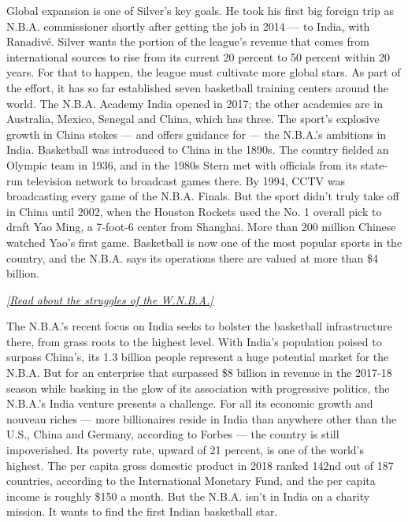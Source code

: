Global expansion is one of Silver's key goals. He took his first big
foreign trip as N.B.A. commissioner shortly after getting the job in
2014 --- to India, with Ranadivé. Silver wants the portion of the
league's revenue that comes from international sources to rise from its
current 20 percent to 50 percent within 20 years. For that to happen,
the league must cultivate more global stars. As part of the effort, it
has so far established seven basketball training centers around the
world. The N.B.A. Academy India opened in 2017; the other academies are
in Australia, Mexico, Senegal and China, which has three. The sport's
explosive growth in China stokes --- and offers guidance for --- the
N.B.A.'s ambitions in India. Basketball was introduced to China in the
1890s. The country fielded an Olympic team in 1936, and in the 1980s
Stern met with officials from its state-run television network to
broadcast games there. By 1994, CCTV was broadcasting every game of the
N.B.A. Finals. But the sport didn't truly take off in China until 2002,
when the Houston Rockets used the No. 1 overall pick to draft Yao Ming,
a 7-foot-6 center from Shanghai. More than 200 million Chinese watched
Yao's first game. Basketball is now one of the most popular sports in
the country, and the N.B.A. says its operations there are valued at more
than \$4 billion.

\href{https://www.nytimes3xbfgragh.onion/2019/09/02/magazine/wnba-atlanta-dream.html}{\emph{{[}Read
about the struggles of the W.N.B.A.{]}}}

The N.B.A.'s recent focus on India seeks to bolster the basketball
infrastructure there, from grass roots to the highest level. With
India's population poised to surpass China's, its 1.3 billion people
represent a huge potential market for the N.B.A. But for an enterprise
that surpassed \$8 billion in revenue in the 2017-18 season while
basking in the glow of its association with progressive politics, the
N.B.A.'s India venture presents a challenge. For all its economic growth
and nouveau riches --- more billionaires reside in India than anywhere
other than the U.S., China and Germany, according to Forbes --- the
country is still impoverished. Its poverty rate, upward of 21 percent,
is one of the world's highest. The per capita gross domestic product in
2018 ranked 142nd out of 187 countries, according to the International
Monetary Fund, and the per capita income is roughly \$150 a month. But
the N.B.A. isn't in India on a charity mission. It wants to find the
first Indian basketball star.

